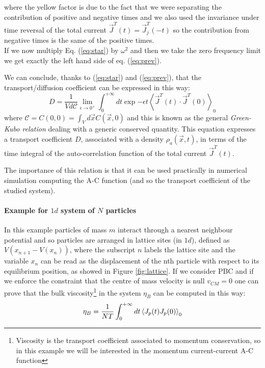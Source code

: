 \documentclass[\main/main.tex]{subfiles}
\begin{document}
where the yellow factor is due to the fact that we were separating the contribution of positive and negative times and we also used the invariance under time reversal of the total current $\vec{J}^T(t)=\vec{J}_j^T(-t)$ so the contribution from negative times is the same of the positive times. \\

If we now multiply Eq. (\ref{eq:star}) by $\omega^2$ and then we take the zero frequency limit we get exactly the left hand side of eq. (\ref{eq:prev}).

We can conclude, thanks to (\ref{eq:star}) and (\ref{eq:prev}), that the transport/diffusion coefficient can be expressed in this way:
\begin{equation}
  \boxed{ D =\frac{1}{ V d \mathscr{C}} \lim_{\epsilon\to 0^+}\int_{0}^{+\infty} d t\exp{-\epsilon t}\left\langle\vec{J}^{T}(t) \cdot \vec{J}^{T}(0)\right\rangle_{0}}
\end{equation}
where $\mathscr{C} = C(0,0) = \int_Vd\vec{x}C(\vec{x},0)$
and this is known as the general \textit{Green-Kubo relation} dealing with a generic conserved quantity. This equation expresses a
transport coefficient $D$, associated with a density $\rho_a(\vec{x}, t)$, in terms of the time integral of
the auto-correlation function of the total current $\vec{J}^T(t)$. 

The importance of this relation is that it can be used practically in numerical simulation computing the A-C function (and so the transport coefficient of the studied system).
\paragraph{Example for $1d$ system of $N$ particles} In this example particles of mass $m$ interact through a nearest neighbour potential and so particles are arranged in lattice sites (in $1d$), defined as $ V(x_{n+1}-V(x_n))$, where the subscript $n$ labels
the lattice site and the variable $x_n$ can be read as the displacement of the nth particle with
respect to its equilibrium position, as showed in Figure \ref{fig:lattice}. If we consider PBC and if we enforce the constraint that the centre of mass velocity is null $v_{CM}=0$ one can prove that the bulk viscosity\footnote{Viscosity is the transport coefficient associated to momentum conservation, so in this example we will be interested in the momentum current-current A-C function} in the system $\eta_B$ can be computed in this way:
\begin{equation}
    \eta_B=\frac{1}{NT}\int_0^{+\infty}dt \left\langle J_p(t)J_p(0) \right\rangle_0
\end{equation}
\end{document}
